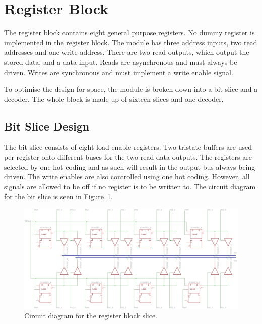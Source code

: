 
\section{Register Block}

The register block contains eight general purpose registers. 
No dummy register is implemented in the register block. 
The module has three address inputs, two read addresses and one write address. 
There are two read outputs, which output the stored data, and a data input. 
Reads are asynchronous and must always be driven. 
Writes are synchronous and must implement a write enable signal. 

To optimise the design for space, the module is broken down into a bit slice and a decoder. 
The whole block is made up of sixteen slices and one decoder. 

\subsection{Bit Slice Design}

The bit slice consists of eight load enable registers. 
Two tristate buffers are used per register onto different buses for the two read data outputs. 
The registers are selected by one hot coding and as such will result in the output bus always being driven. 
The write enables are also controlled using one hot coding. 
However, all signals are allowed to be off if no register is to be written to.
The circuit diagram for the bit slice is seen in Figure~\ref{fig:reg:slice}.

\begin{figure}
\centering
\includegraphics[angle=90,height=\textheight]{../../eagle/regBlock/regBlock_slice.png}
\caption{Circuit diagram for the register block slice.}
\label{fig:reg:slice}
\end{figure}



